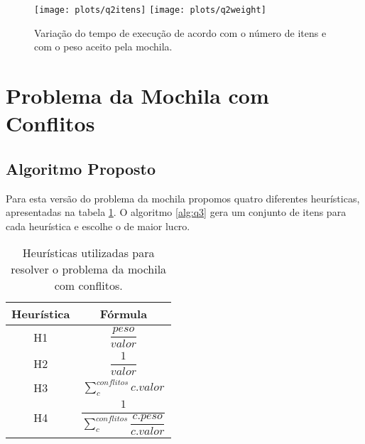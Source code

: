 \documentclass[a4paper]{article}
\begin{document}
\begin{figure}[H]
\centering
\texttt{[image: plots/q2itens]}
\texttt{[image: plots/q2weight]}
\caption{Variação do tempo de execução de acordo com o número de itens e com o peso aceito pela mochila.}
\label{fig:q2:itens}
\end{figure}

\section{Problema da Mochila com Conflitos}

\subsection{Algoritmo Proposto}

Para esta versão do problema da mochila propomos quatro diferentes heurísticas, apresentadas na tabela \ref{tab:q3:heuristics}. O algoritmo \ref{alg:q3} gera um conjunto de itens para cada heurística e escolhe o de maior lucro.

\begin{table}[H]
\centering
\renewcommand{\arraystretch}{2.5}
\begin{tabular}{c|c}
Heurística & Fórmula \\\hline
H1 & $\dfrac{peso}{valor}$ \\
H2 & $\dfrac{1}{valor}$ \\
H3 & $\sum^{conflitos}_{c} c.valor$ \\
H4 & $\dfrac{1}{\sum^{conflitos}_{c}\dfrac{c.peso}{c.valor}}$ \\
\end{tabular}
\caption{Heurísticas utilizadas para resolver o problema da mochila com conflitos.}
\label{tab:q3:heuristics}
\end{table}
\end{document}
